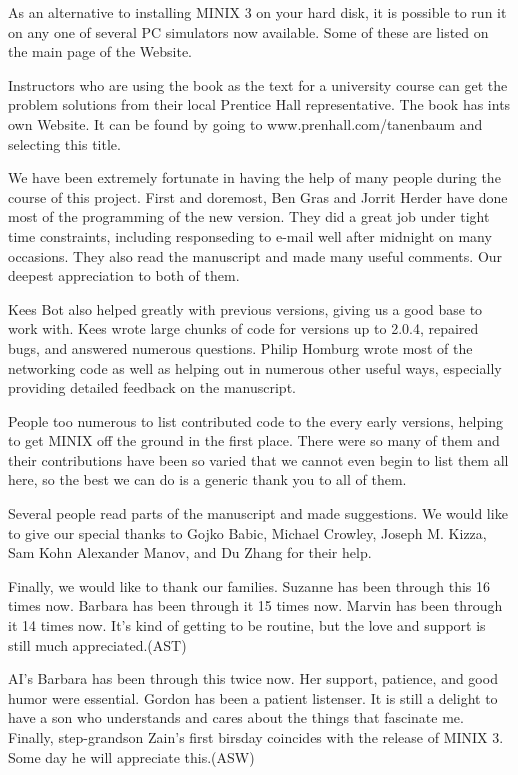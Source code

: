 \documentclass{book}
\begin{document}
As an alternative to installing MINIX 3 on your hard disk, it is possible to run it on any one of several PC simulators now available.
Some of these are listed on the main page of the Website.

Instructors who are using the book as the text for a university course can get the problem solutions from their local Prentice Hall representative. 
The book has ints own Website.
It can be found by going to www.prenhall.com/tanenbaum and selecting this title.

We have been extremely fortunate in having the help of many people during the course of this project.
First and doremost, Ben Gras and Jorrit Herder have done most of the programming of the new version.
They did a great job under tight time constraints, including responseding to e-mail well after midnight on many occasions. 
They also read the manuscript and made many useful comments.
Our deepest appreciation to both of them.

Kees Bot also helped greatly with previous versions, giving us a good base to work with.
Kees wrote large chunks of code for versions up to 2.0.4, repaired bugs, and answered numerous questions.
Philip Homburg wrote most of the networking code as well as helping out in numerous other useful ways, 
especially providing detailed feedback on the manuscript.

People too numerous to list contributed code to the every early versions, helping to get MINIX off the ground in the first place.
There were so many of them and their contributions have been so varied that we cannot even begin to list them all here,
so the best we can do is a generic thank you to all of them.

Several people read parts of the manuscript and made suggestions.
We would like to give our special thanks to Gojko Babic, Michael Crowley, Joseph M. Kizza, Sam Kohn Alexander Manov, and Du Zhang for their help.

Finally, we would like to thank our families. 
Suzanne has been through this 16 times now. 
Barbara has been through it 15 times now.
Marvin has been through it 14 times now.
It's kind of getting to be routine, but the love and support is still much appreciated.(AST)

AI's Barbara has been through this twice now.
Her support, patience, and good humor were essential.
Gordon has been a patient listenser.
It is still a delight to have a son who understands and cares about the things that fascinate me.
Finally, step-grandson Zain's first birsday coincides with the release of MINIX 3.
Some day he will appreciate this.(ASW)
\end{document}
